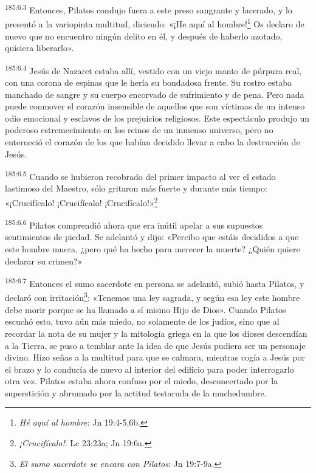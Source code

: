 \par
\textsuperscript{185:6.3} Entonces, Pilatos condujo fuera a este preso sangrante y lacerado, y lo presentó a la variopinta multitud, diciendo: «¡He aquí al hombre!\footnote{\textit{Hé aquí al hombre}: Jn 19:4-5,6b.} Os declaro de nuevo que no encuentro ningún delito en él, y después de haberlo azotado, quisiera liberarlo».

\par
\textsuperscript{185:6.4} Jesús de Nazaret estaba allí, vestido con un viejo manto de púrpura real, con una corona de espinas que le hería su bondadosa frente. Su rostro estaba manchado de sangre y su cuerpo encorvado de sufrimiento y de pena. Pero nada puede conmover el corazón insensible de aquellos que son víctimas de un intenso odio emocional y esclavos de los prejuicios religiosos. Este espectáculo produjo un poderoso estremecimiento en los reinos de un inmenso universo, pero no enterneció el corazón de los que habían decidido llevar a cabo la destrucción de Jesús.

\par
\textsuperscript{185:6.5} Cuando se hubieron recobrado del primer impacto al ver el estado lastimoso del Maestro, sólo gritaron más fuerte y durante más tiempo: «¡Crucifícalo! ¡Crucifícalo! ¡Crucifícalo!»\footnote{\textit{¡Crucifícalo!}: Lc 23:23a; Jn 19:6a.}

\par
\textsuperscript{185:6.6} Pilatos comprendió ahora que era inútil apelar a sus supuestos sentimientos de piedad. Se adelantó y dijo: «Percibo que estáis decididos a que este hombre muera, ¿pero qué ha hecho para merecer la muerte? ¿Quién quiere declarar su crimen?»

\par
\textsuperscript{185:6.7} Entonces el sumo sacerdote en persona se adelantó, subió hasta Pilatos, y declaró con irritación\footnote{\textit{El sumo sacerdote se encara con Pilatos}: Jn 19:7-9a.}: «Tenemos una ley sagrada, y según esa ley este hombre debe morir porque se ha llamado a sí mismo Hijo de Dios». Cuando Pilatos escuchó esto, tuvo aún más miedo, no solamente de los judíos, sino que al recordar la nota de su mujer y la mitología griega en la que los dioses descendían a la Tierra, se puso a temblar ante la idea de que Jesús pudiera ser un personaje divino. Hizo señas a la multitud para que se calmara, mientras cogía a Jesús por el brazo y lo conducía de nuevo al interior del edificio para poder interrogarlo otra vez. Pilatos estaba ahora confuso por el miedo, desconcertado por la superstición y abrumado por la actitud testaruda de la muchedumbre.

